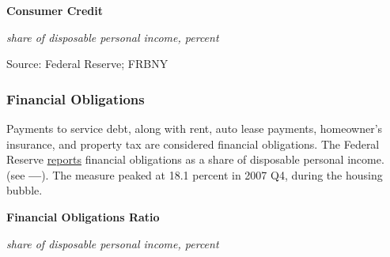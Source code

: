 \documentclass{report}
\makeatletter
\newcommand{\tbllink}[1]{\href{https://raw.githubusercontent.com/bdecon/US-chartbook/master/chartbook/data/#1}{\faTable}}
\newcommand*\short[1]{\expandafter\@gobbletwo\number\numexpr#1\relax}
\newcommand{\stdnode}[3]{\node[below, align=left, shift=({#1,#2})]{#3};}
\newcommand{\dateaxisticks}{
		date coordinates in=x, axis line style={draw=none},
		xmax={2020-08-10},
		max space between ticks=40,	    
		xtick={{1990-01-01}, {1992-01-01}, {1994-01-01}, 
			{1996-01-01}, {1998-01-01}, {2000-01-01}, 
			{2002-01-01}, {2004-01-01}, {2006-01-01},
			{2008-01-01}, {2010-01-01}, {2012-01-01}, {2014-01-01},
		    {2016-01-01}, {2018-01-01}, {2020-01-01}},
		minor xtick={{1989-01-01}, {1991-01-01}, {1993-01-01},
			{1995-01-01}, {1997-01-01}, {1999-01-01}, 
			{2001-01-01}, {2003-01-01}, {2005-01-01}, {2007-01-01},
		    {2009-01-01}, {2011-01-01}, {2013-01-01}, {2015-01-01},
		    {2017-01-01}, {2019-01-01}},
		enlarge y limits={0.06}, enlarge x limits={0.01},
		}
\newcommand{\shdateaxisticks}{
		date coordinates in=x, axis line style={draw=none},
		xmax={2021-01-01},
		max space between ticks=40,	    
		xtick={{1990-01-01}, {1995-01-01}, {2000-01-01}, 
			{2005-01-01}, {2010-01-01}, {2015-01-01}, {2020-01-01}},
		minor xtick={},
		enlarge y limits={0.06}, enlarge x limits={0.01},
		}
\newcommand{\bbar}[2]{extra #1 ticks = {{#2}}, extra #1 tick labels = ,
		extra #1 tick style = {grid=major, grid style={thick, black!25}},}
\newcommand{\stdline}[4]{\addplot[very thick, no markers, color=#1] 
		table [x=#2, y=#3, col sep=comma] {#4};	}
\newcommand{\thinline}[4]{\addplot[no markers, color=#1] 
		table [x=#2, y=#3, col sep=comma] {#4};	}
\newcommand{\thickline}[4]{\addplot[ultra thick, no markers, color=#1] 
		table [x=#2, y=#3, col sep=comma] {#4};	}
\newcommand{\rbars}{
		\fill[color=black!10] (axis cs:{1990-07-01},\pgfkeysvalueof{/pgfplots/ymin}) rectangle 
			(axis cs:{1991-03-01}, \pgfkeysvalueof{/pgfplots/ymax});
		\fill[color=black!10] (axis cs:{2007-12-01},\pgfkeysvalueof{/pgfplots/ymin}) rectangle 
			(axis cs:{2009-07-01}, \pgfkeysvalueof{/pgfplots/ymax});
		\fill[color=black!10] (axis cs:{2001-03-01},\pgfkeysvalueof{/pgfplots/ymin}) rectangle 
			(axis cs:{2001-11-01}, \pgfkeysvalueof{/pgfplots/ymax});
		\fill[color=black!10] (axis cs:{2020-02-01},\pgfkeysvalueof{/pgfplots/ymin}) rectangle 
			(axis cs:{2020-09-01}, \pgfkeysvalueof{/pgfplots/ymax});}
\makeatother
\begin{document}
{{{\begin{minipage}{0.76\textwidth}


\vspace{3mm}

\normalsize \textbf{Consumer Credit}

\footnotesize{\textit{share of disposable personal income, percent}}

\hspace*{-2mm} 

\footnotesize{Source: Federal Reserve; FRBNY} \hfill \tbllink{cc_dpi_monthly.csv}
\end{minipage}

\vspace{5mm}

\subsubsection*{\color{black!70} \seriffont Financial Obligations}
\begin{minipage}{0.3\textwidth}
\small Payments to service debt, along with rent, auto lease payments, homeowner's insurance, and property tax are considered financial obligations. The Federal Reserve \href{https://www.federalreserve.gov/releases/housedebt/default.htm}{reports} financial obligations as a share of disposable personal income.   (see {\color{blue!80!black}\textbf{---}}). The measure peaked at 18.1 percent in 2007 Q4, during the housing bubble.
\end{minipage}\hspace{8mm}
\begin{minipage}{0.405\textwidth}
\normalsize \textbf{Financial Obligations Ratio}

\footnotesize{\textit{share of disposable personal income, percent}}

\hspace*{-2mm} 


\end{minipage}}}}
\end{document}
